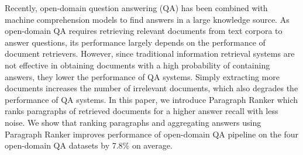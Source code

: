 Recently, open-domain question answering (QA) has been combined with machine comprehension models to find answers in a large knowledge source. As open-domain QA requires retrieving relevant documents from text corpora to answer questions, its performance largely depends on the performance of document retrievers. However, since traditional information retrieval systems are not effective in obtaining documents with a high probability of containing answers, they lower the performance of QA systems. Simply extracting more documents increases the number of irrelevant documents, which also degrades the performance of QA systems. In this paper, we introduce Paragraph Ranker which ranks paragraphs of retrieved documents for a higher answer recall with less noise. We show that ranking paragraphs and aggregating answers using Paragraph Ranker improves performance of open-domain QA pipeline on the four open-domain QA datasets by 7.8\% on average.
